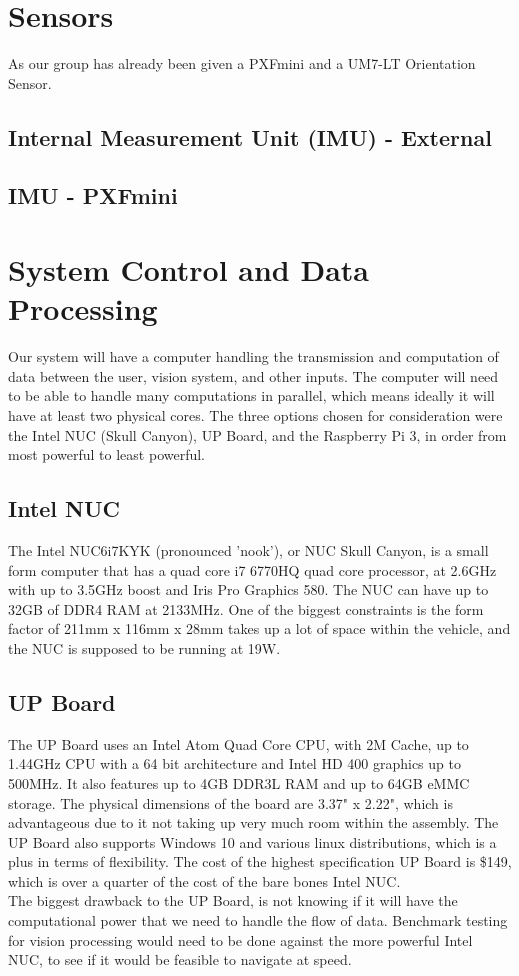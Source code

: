\documentclass[compsoc,draftclsnofoot,onecolumn,10pt]{IEEEtran}
\begin{document}
\section{Sensors}
As our group has already been given a PXFmini and a UM7-LT Orientation Sensor. 
\subsection{Internal Measurement Unit (IMU) - External}
\subsection{IMU - PXFmini}


\section{System Control and Data Processing}
Our system will have a computer handling the transmission and computation of data between the user, vision system, and other inputs. 
The computer will need to be able to handle many computations in parallel, which means ideally it will have at least two physical cores. 
The three options chosen for consideration were the Intel NUC (Skull Canyon), UP Board, and the Raspberry Pi 3, in order from most powerful to least powerful. 

\subsection{Intel NUC}
The Intel NUC6i7KYK (pronounced 'nook'), or NUC Skull Canyon, is a small form computer that has a quad core i7 6770HQ quad core processor, at 2.6GHz with up to 3.5GHz boost and Iris Pro Graphics 580. 
The NUC can have up to 32GB of DDR4 RAM at 2133MHz. 
One of the biggest constraints is the form factor of 211mm x 116mm x 28mm takes up a lot of space within the vehicle, and the NUC is supposed to be running at 19W. 

\subsection{UP Board}
The UP Board uses an Intel Atom Quad Core CPU, with 2M Cache, up to 1.44GHz CPU with a 64 bit architecture and Intel HD 400 graphics up to 500MHz. 
It also features up to 4GB DDR3L RAM and up to 64GB eMMC storage. 
The physical dimensions of the board are 3.37" x 2.22", which is advantageous due to it not taking up very much room within the assembly. 
The UP Board also supports Windows 10 and various linux distributions, which is a plus in terms of flexibility. 
The cost of the highest specification UP Board is \$149, which is over a quarter of the cost of the bare bones Intel NUC. \\
The biggest drawback to the UP Board, is not knowing if it will have the computational power that we need to handle the flow of data. 
Benchmark testing for vision processing would need to be done against the more powerful Intel NUC, to see if it would be feasible to navigate at speed. 
\end{document}
